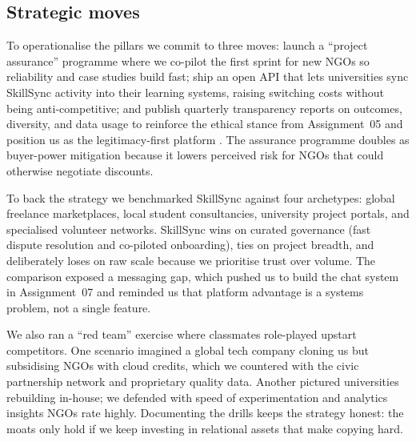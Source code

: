\subsection*{Strategic moves}
To operationalise the pillars we commit to three moves: launch a ``project assurance'' programme where we co-pilot the first sprint for new NGOs so reliability and case studies build fast; ship an open API that lets universities sync SkillSync activity into their learning systems, raising switching costs without being anti-competitive; and publish quarterly transparency reports on outcomes, diversity, and data usage to reinforce the ethical stance from Assignment~05 and position us as the legitimacy-first platform \citep{Srnicek2017,Zuboff2019}. The assurance programme doubles as buyer-power mitigation because it lowers perceived risk for NGOs that could otherwise negotiate discounts.

To back the strategy we benchmarked SkillSync against four archetypes: global freelance marketplaces, local student consultancies, university project portals, and specialised volunteer networks. SkillSync wins on curated governance (fast dispute resolution and co-piloted onboarding), ties on project breadth, and deliberately loses on raw scale because we prioritise trust over volume. The comparison exposed a messaging gap, which pushed us to build the chat system in Assignment~07 and reminded us that platform advantage is a systems problem, not a single feature.

We also ran a ``red team'' exercise where classmates role-played upstart competitors. One scenario imagined a global tech company cloning us but subsidising NGOs with cloud credits, which we countered with the civic partnership network and proprietary quality data. Another pictured universities rebuilding in-house; we defended with speed of experimentation and analytics insights NGOs rate highly. Documenting the drills keeps the strategy honest: the moats only hold if we keep investing in relational assets that make copying hard.

